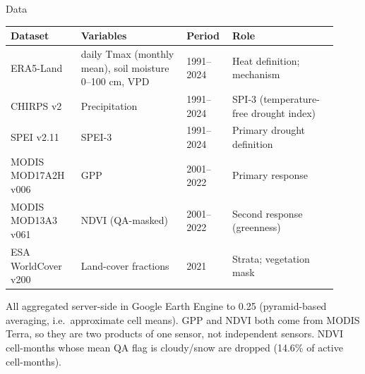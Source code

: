 \documentclass[12pt,aspectratio=169]{beamer}
\begin{document}
\begin{frame}{Data}
  \scriptsize
  \renewcommand{\arraystretch}{0.85}
  \setlength{\tabcolsep}{4pt}
  \begin{tabular}{@{}p{0.2\linewidth}p{0.3\linewidth}p{0.12\linewidth}p{0.3\linewidth}@{}}
    \toprule
    \textbf{Dataset} & \textbf{Variables} & \textbf{Period} & \textbf{Role} \\
    \midrule
    ERA5-Land \citep{munozsabater2021} & daily Tmax (monthly mean), soil moisture 0--100 cm, VPD & 1991--2024 &
      Heat definition; mechanism \\
    CHIRPS v2 \citep{funk2015} & Precipitation & 1991--2024 &
      SPI-3 (temperature-free drought index) \\
    SPEI v2.11 \citep{vicenteserrano2010} & SPEI-3 & 1991--2024 &
      Primary drought definition \\
    MODIS MOD17A2H v006 \citep{running2015,running2004} & GPP & 2001--2022 &
      Primary response \\
    MODIS MOD13A3 v061 \citep{didan2021} & NDVI (QA-masked) & 2001--2022 &
      Second response (greenness) \\
    ESA WorldCover v200 \citep{zanaga2022} & Land-cover fractions & 2021 &
      Strata; vegetation mask \\
    \bottomrule
  \end{tabular}

  \vspace{4pt}
  \tiny All aggregated server-side in Google Earth Engine \citep{gorelick2017}
  to 0.25\textdegree{} (pyramid-based averaging, i.e.\ approximate cell means).
  GPP and NDVI both come from MODIS Terra, so they are two products of one
  sensor, not independent sensors. NDVI cell-months whose mean QA flag is
  cloudy/snow are dropped (14.6\% of active cell-months).
\end{frame}
\end{document}
